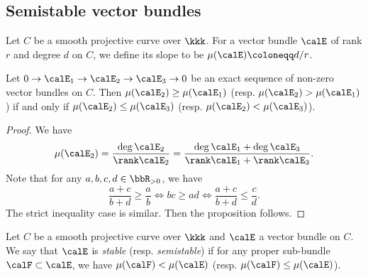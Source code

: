 
\subsection{Semistable vector bundles}

    \begin{definition}\label{def:slope_of_vector_bundles_over_curves}
        Let \(C\) be a smooth projective curve over \(\kkk\).
        For a vector bundle \(\calE\) of rank \(r\) and degree \(d\) on \(C\), we define its slope to be \(\mu(\calE) \coloneqq d/r\).
    \end{definition}

    \begin{proposition}\label{lem:slope_of_exact_sequence}
        Let \(0 \to \calE_1 \to \calE_2 \to \calE_3 \to 0\) be an exact sequence of non-zero vector bundles on \(C\).
        Then \(\mu(\calE_2) \geq \mu(\calE_1)\) (resp. \(\mu(\calE_2) > \mu(\calE_1)\)) if and only if \(\mu(\calE_2) \leq \mu(\calE_3)\) (resp. \(\mu(\calE_2) < \mu(\calE_3)\)).
    \end{proposition}
    \begin{proof}
        We have 
        \[ \mu(\calE_2) = \frac{\deg \calE_2}{\rank \calE_2} = \frac{\deg \calE_1 + \deg \calE_3}{\rank \calE_1 + \rank \calE_3}. \]
        Note that for any \(a,b,c,d \in \bbR_{>0}\), we have 
        \[\frac{a+c}{b+d} \geq \frac{a}{b} \iff bc \geq ad \iff \frac{a+c}{b+d} \leq \frac{c}{d}. \]
        The strict inequality case is similar.
        Then the proposition follows.
    \end{proof}

    \begin{definition}\label{def:stable_and_semistable_vector_bundles_over_curves}
        Let \(C\) be a smooth projective curve over \(\kkk\) and \(\calE\) a vector bundle on \(C\).
        We say that \(\calE\) is \emph{stable} (resp. \emph{semistable}) if for any proper sub-bundle \(\calF \subset \calE\), we have \(\mu(\calF) < \mu(\calE)\) (resp. \(\mu(\calF) \leq \mu(\calE)\)).
    \end{definition}

